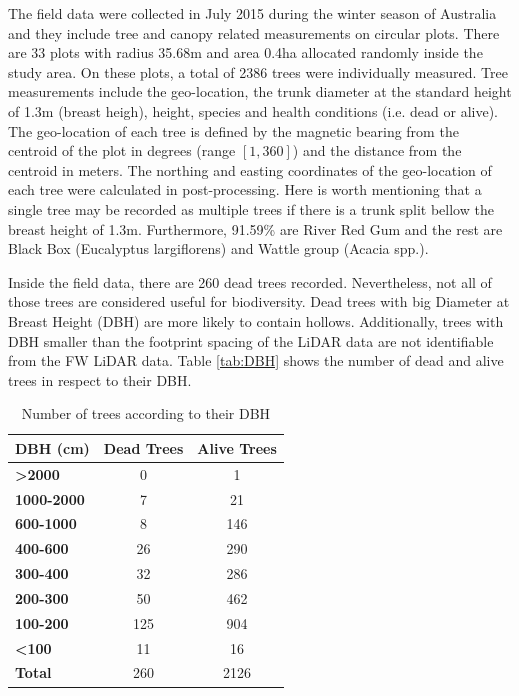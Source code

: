 \documentclass{subfiles}
\begin{document}
\par The field data were collected in July 2015 during the winter season of Australia and they include tree and canopy related measurements on circular plots. There are 33 plots with radius 35.68m and area 0.4ha  allocated randomly inside the study area. On these plots, a total of 2386 trees were individually measured.  Tree measurements include the geo-location, the trunk diameter at the standard height of 1.3m (breast heigh), height, species and health conditions (i.e. dead or alive). The geo-location of each tree is defined by the magnetic bearing from the centroid of the plot in degrees (range $[1,360]$) and the distance from the centroid in meters. The northing and easting coordinates of the geo-location of each tree were calculated in post-processing. Here is worth mentioning that a single tree may be recorded as multiple trees if there is a trunk split bellow the breast height of 1.3m. Furthermore, 91.59\% are River Red Gum and the rest are Black Box (Eucalyptus largiflorens) and Wattle group (Acacia spp.). 

\par Inside the field data, there are 260 dead trees recorded. Nevertheless, not all of those trees are considered useful for biodiversity. Dead trees with big Diameter at Breast Height (DBH) are more likely to contain hollows. Additionally, trees with DBH smaller than the footprint spacing of the LiDAR data are not identifiable from the FW LiDAR data. Table \ref{tab:DBH} shows the number of dead and alive trees in respect to their DBH. 

\begin{table}[!h]
	\centering
	\begin{tabular}{| l || c | c | }
		\hline		
		\textbf{DBH (cm)} &\textbf{Dead Trees} & \textbf{Alive Trees }\\	
		\hline			
		\hline			
		\textbf{>2000} & 0 & 1\\
		\hline			
		\textbf{1000-2000} & 7 & 21\\
		\hline			
		\textbf{600-1000} & 8 & 146\\
		\hline			
		\textbf{400-600} & 26 & 290\\
		\hline			
		\textbf{300-400} & 32 & 286\\
		\hline			
		\textbf{200-300} & 50 & 462\\
		\hline			
		\textbf{100-200} &125 & 904\\
		\hline			
		\textbf{<100} & 11 & 16\\
		\hline			
		\textbf{Total} & 260 & 2126 \\
		\hline  
	\end{tabular}
	\caption{Number of trees according to their DBH}
\end{table}
\end{document}
